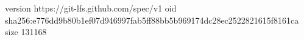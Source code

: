 version https://git-lfs.github.com/spec/v1
oid sha256:e776dd9b80b1ef07d946997fab5ff88bb5b969174dc28ec2522821615f8161ca
size 131168
